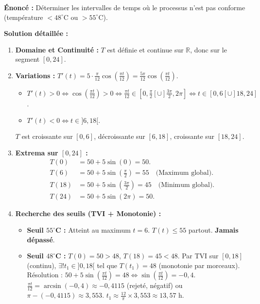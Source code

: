 \documentclass[11pt]{article}
\begin{document}
\begin{exoresolu}
\textbf{Énoncé :} Déterminer les intervalles de temps où le processus n'est pas conforme (température $< 48^\circ$C ou $> 55^\circ$C).

\textbf{Solution détaillée :}
\begin{enumerate}
    \item \textbf{Domaine et Continuité :} $T$ est définie et continue sur $\mathbb{R}$, donc sur le segment $[0, 24]$.
    \item \textbf{Variations :} $T'(t) = 5 \cdot \frac{\pi}{12} \cos\left(\frac{\pi t}{12}\right) = \frac{5\pi}{12}\cos\left(\frac{\pi t}{12}\right)$.
        \begin{itemize}
            \item $T'(t) > 0 \iff \cos(\frac{\pi t}{12}) > 0 \iff \frac{\pi t}{12} \in [0, \frac{\pi}{2}[ \cup ]\frac{3\pi}{2}, 2\pi] \iff t \in [0, 6[ \cup ]18, 24]$.
            \item $T'(t) < 0 \iff t \in ]6, 18[$.
        \end{itemize}
        $T$ est croissante sur $[0,6]$, décroissante sur $[6,18]$, croissante sur $[18,24]$.
    \item \textbf{Extrema sur $[0,24]$ :}
        \begin{align*}
            T(0) &= 50 + 5\sin(0) = 50. \\
            T(6) &= 50 + 5\sin(\frac{\pi}{2}) = 55 \quad \text{(Maximum global)}. \\
            T(18) &= 50 + 5\sin(\frac{3\pi}{2}) = 45 \quad \text{(Minimum global)}. \\
            T(24) &= 50 + 5\sin(2\pi) = 50.
        \end{align*}
    \item \textbf{Recherche des seuils (TVI + Monotonie) :}
        \begin{itemize}
            \item \textbf{Seuil $55^\circ$C :} Atteint au maximum $t=6$. $T(t) \le 55$ partout. \textbf{Jamais dépassé}.
            \item \textbf{Seuil $48^\circ$C :} $T(0)=50 > 48$, $T(18)=45 < 48$. Par TVI sur $[0,18]$ (continu), $\exists! t_1 \in ]0,18[$ tel que $T(t_1)=48$ (monotonie par morceaux).
                Résolution : $50 + 5\sin(\frac{\pi t}{12}) = 48 \iff \sin(\frac{\pi t}{12}) = -0,4$.
                $\frac{\pi t}{12} = \arcsin(-0,4) \approx -0,4115$ (rejeté, négatif) ou $\pi - (-0,4115) \approx 3,553$.
                $t_1 \approx \frac{12}{\pi} \times 3,553 \approx 13,57$ h.

\end{itemize}
\end{enumerate}
\end{exoresolu}
\end{document}
